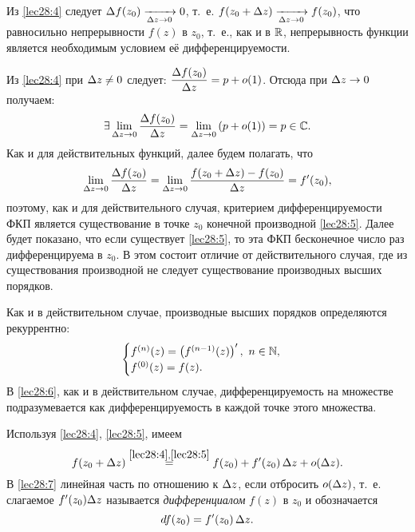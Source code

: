 \documentclass[../../main.tex]{subfiles}
\begin{document}
Из \eqref{lec28:4} следует
$\Delta f(z_0) \xrightarrow[\Delta z \to 0]{} 0$,
т.~е. $f(z_0 + \Delta z) \xrightarrow[\Delta z \to 0]{} f(z_0)$,
что равносильно непрерывности $f(z)$ в $z_0$,
т.~е., как и в $\mathbb{R}$, непрерывность функции является необходимым условием её
дифференцируемости.

Из \eqref{lec28:4} при $\Delta z \ne 0$ следует: 
$\dfrac{\Delta f(z_0)}{\Delta z} = p + o(1)$.
Отсюда при $\Delta z \to 0$ получаем:
\[\exists \lim\limits_{\Delta z \to 0} \dfrac{\Delta f(z_0)}{\Delta z} =
\lim\limits_{\Delta z \to 0} \left(p + o(1)\right) = p \in \mathbb{C}.\]
Как и для действительных функций, далее будем полагать, что
\begin{equation}
\label{lec28:5}
\lim\limits_{\Delta z \to 0} \frac{\Delta f(z_0)}{\Delta z} =
\lim\limits_{\Delta z \to 0} \frac{f(z_0 + \Delta z) - f(z_0)}{\Delta z} = f'(z_0),
\end{equation}
поэтому, как и для действительного случая, критерием дифференцируемости ФКП
является существование в точке $z_0$ конечной производной \eqref{lec28:5}.
Далее будет показано, что если существует \eqref{lec28:5}, то эта ФКП
бесконечное число раз дифференцируема в $z_0$. В этом состоит отличие от 
действительного случая, где из существования производной
не следует существование производных высших порядков. 

Как и в действительном случае, производные высших порядков определяются 
рекуррентно:
\begin{equation}
\label{lec28:6}
\begin{cases}
	f^{(n)} (z) = \left(f^{(n - 1)} (z)\right)',\ n \in \mathbb{N}, \\
	f^{(0)} (z) = f(z).
\end{cases}
\end{equation}
В \eqref{lec28:6}, как и в действительном случае, дифференцируемость
на множестве подразумевается как дифференцируемость в каждой точке
этого множества.

Используя \eqref{lec28:4}, \eqref{lec28:5}, имеем
\begin{equation}
\label{lec28:7}
f(z_0 + \Delta z) \stackrel{\eqref{lec28:4}, \eqref{lec28:5}}{=}
f(z_0) + f'(z_0)\, \Delta z + o(\Delta z).
\end{equation}
В \eqref{lec28:7} линейная часть по отношению к $\Delta z$, если отбросить
$o(\Delta z)$, т.~е. слагаемое $f'(z_0) \Delta z$ называется \emph{дифференциалом}
$f(z)$ в $z_0$ и обозначается 
\begin{equation}
\label{lec28:8}
d f(z_0) = f'(z_0)\, \Delta z.
\end{equation}
\end{document}
